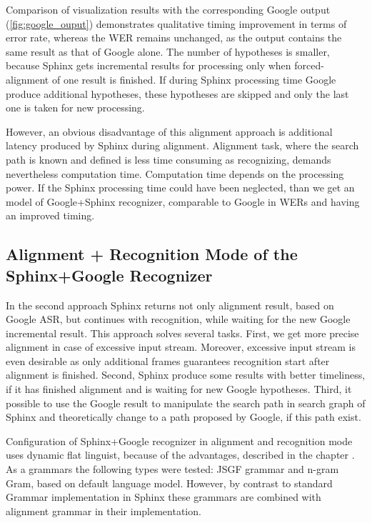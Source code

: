Comparison of visualization results with the corresponding Google
output (\ref{fig:google_ouput}) demonstrates qualitative timing improvement in terms
of error rate, whereas the WER remains unchanged, as the output contains the
same result as that of Google alone. The number of hypotheses is smaller,
because Sphinx gets incremental results for processing only when
forced-alignment of one result is finished.  If during Sphinx processing time
Google produce additional hypotheses, these hypotheses are skipped and only the
last one is taken for new processing. 

However, an obvious disadvantage of this alignment approach is additional
latency produced by Sphinx during alignment.
Alignment task, where the search path is known and defined is less time
consuming as recognizing, demands nevertheless computation time.  Computation
time depends on the processing power. If the Sphinx processing time could have
been neglected, than we get an model of Google+Sphinx recognizer,
comparable to Google in WERs and having an improved timing.

\subsection {Alignment + Recognition Mode  of the Sphinx+Google Recognizer}

In the second approach Sphinx returns not only alignment result, based on Google
ASR, but continues with recognition, while waiting for the new Google incremental result. 
This approach solves several tasks. First, we get more precise alignment  in
case of excessive input stream. Moreover, excessive input stream is
even desirable as only additional frames guarantees recognition start after
alignment is finished. Second, Sphinx produce some results with better
timeliness, if it has finished alignment and is waiting for new Google
hypotheses. Third, it possible to use the Google result to manipulate the search
path in search graph of Sphinx and theoretically change to a path proposed by
Google, if this path exist. 

Configuration of Sphinx+Google recognizer in alignment and recognition mode
uses dynamic flat linguist, because of the  advantages, described in the chapter
\label{ref:sphinx}. As a grammars the following types were tested: JSGF grammar
and n-gram Gram, based on default language model.  However, by contrast to standard Grammar
implementation in Sphinx these grammars are combined with alignment grammar in
their implementation.



